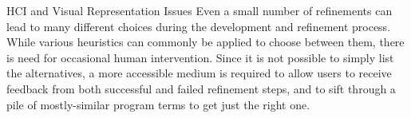 \begin{subparagraph}{HCI and Visual Representation Issues}
Even a small number of refinements can lead to many different choices
during the development and refinement process.
While various heuristics can commonly be applied to choose between them,
there is need for occasional human intervention.
Since it is not possible to simply list the alternatives, a more accessible
medium is required to allow users to receive feedback from both successful
and failed refinement steps, and to sift through a pile of mostly-similar
program terms to get just the right one.
\end{subparagraph}